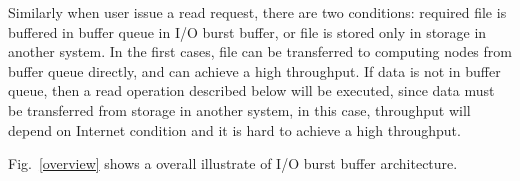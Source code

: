 
Similarly when user issue a read request, there are two conditions: required file is buffered in buffer queue in I/O burst buffer, or file is stored only in storage in another system.
In the first cases, file can be transferred to computing nodes from buffer queue directly, and can achieve a high throughput.
If data is not in buffer queue, then a read operation described below will be executed, since data must be transferred from storage in another system, in this case, throughput will depend on Internet condition and it is hard to achieve a high throughput.

Fig.~\ref{overview} shows a overall illustrate of I/O burst buffer architecture.